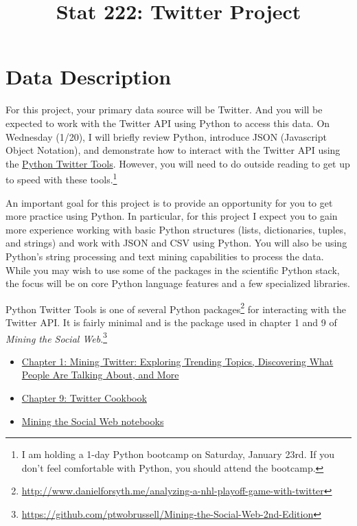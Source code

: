 \documentclass[11pt, oneside]{article}   	%
\title{Stat 222: Twitter Project}
\date{}							%
\begin{document}
\maketitle

\section{Data Description}

For this project, your primary data source will be Twitter.  And you will be
expected to work with the Twitter API using Python to access this data. On
Wednesday (1/20), I will briefly review Python, introduce JSON (Javascript Object
Notation), and demonstrate how to interact with the Twitter API using the
\href{https://github.com/sixohsix/twitter}{Python Twitter Tools}.  However, you
will need to do outside reading to get up to speed with these tools.\footnote{I
am holding a 1-day Python bootcamp on Saturday, January 23rd.  If you don't feel
comfortable with Python, you should attend the bootcamp.}

An important goal for this project is to provide an opportunity for you to get
more practice using Python.  In particular, for this project I expect you to
gain more experience working with basic Python structures (lists, dictionaries,
tuples, and strings) and work with JSON and CSV using Python.  You will also be
using Python's string processing and text mining capabilities to process the
data.  While you may wish to use some of the packages in the scientific Python
stack, the focus will be on core Python language features and a few specialized
libraries.

Python Twitter Tools is one of several Python
packages\footnote{\url{http://www.danielforsyth.me/analyzing-a-nhl-playoff-game-with-twitter}}
for interacting with the Twitter API.  It is fairly minimal and is the package
used in chapter 1 and 9 of \emph{Mining the Social
Web}.\footnote{\url{https://github.com/ptwobrussell/Mining-the-Social-Web-2nd-Edition}}
\begin{itemize}
\item \href{https://rawgit.com/ptwobrussell/Mining-the-Social-Web-2nd-Edition/master/ipynb/html/Chapter%201%20-%20Mining%20Twitter.html}{Chapter 1: Mining Twitter: Exploring Trending Topics, Discovering What People Are Talking About, and More}
\item \href{https://rawgit.com/ptwobrussell/Mining-the-Social-Web-2nd-Edition/master/ipynb/html/Chapter%209%20-%20Twitter%20Cookbook.html}{Chapter 9: Twitter Cookbook}
\item \href{http://nbviewer.ipython.org/github/ptwobrussell/Mining-the-Social-Web-2nd-Edition/tree/master/ipynb/}{Mining the Social Web notebooks}
\end{itemize}
\end{document}
